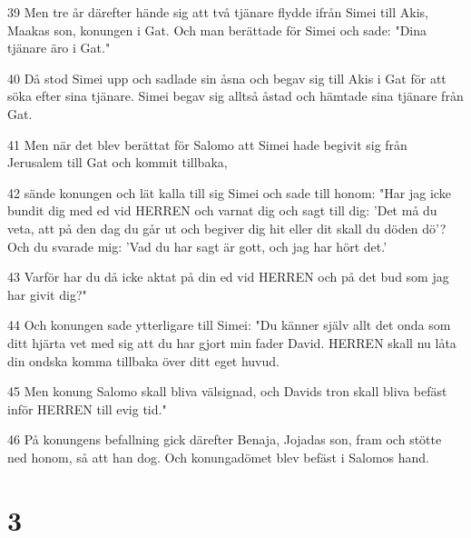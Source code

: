 \par 39 Men tre år därefter hände sig att två tjänare flydde ifrån Simei till Akis, Maakas son, konungen i Gat. Och man berättade för Simei och sade: "Dina tjänare äro i Gat."
\par 40 Då stod Simei upp och sadlade sin åsna och begav sig till Akis i Gat för att söka efter sina tjänare. Simei begav sig alltså åstad och hämtade sina tjänare från Gat.
\par 41 Men när det blev berättat för Salomo att Simei hade begivit sig från Jerusalem till Gat och kommit tillbaka,
\par 42 sände konungen och lät kalla till sig Simei och sade till honom: "Har jag icke bundit dig med ed vid HERREN och varnat dig och sagt till dig: 'Det må du veta, att på den dag du går ut och begiver dig hit eller dit skall du döden dö'? Och du svarade mig: 'Vad du har sagt är gott, och jag har hört det.'
\par 43 Varför har du då icke aktat på din ed vid HERREN och på det bud som jag har givit dig?"
\par 44 Och konungen sade ytterligare till Simei: "Du känner själv allt det onda som ditt hjärta vet med sig att du har gjort min fader David. HERREN skall nu låta din ondska komma tillbaka över ditt eget huvud.
\par 45 Men konung Salomo skall bliva välsignad, och Davids tron skall bliva befäst inför HERREN till evig tid."
\par 46 På konungens befallning gick därefter Benaja, Jojadas son, fram och stötte ned honom, så att han dog. Och konungadömet blev befäst i Salomos hand.

\chapter{3}

